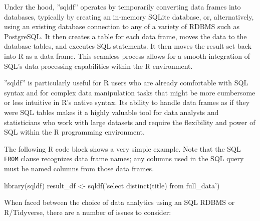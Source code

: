 Under the hood, ''sqldf'' operates by temporarily converting data frames into databases, typically by creating an in-memory SQLite database, or, alternatively, using an existing database connection to any of a variety of RDBMS such as PostgreSQL. It then creates a table for each data frame, moves the data to the database tables, and executes SQL statements. It then moves the result set back into R as a data frame. This seamless process allows for a smooth integration of SQL's data processing capabilities within the R environment.

''sqldf'' is particularly useful for R users who are already comfortable with SQL syntax and for complex data manipulation tasks that might be more cumbersome or less intuitive in R's native syntax. Its ability to handle data frames as if they were SQL tables makes it a highly valuable tool for data analysts and statisticians who work with large datasets and require the flexibility and power of SQL within the R programming environment.

The following R code block shows a very simple example. Note that the SQL \texttt{FROM} clause recognizes data frame names; any columns used in the SQL query must be named columns from those data frames.

\begin{Rcode}
library(sqldf)
result_df <- sqldf('select distinct(title) from full_data')
\end{Rcode}

When faced between the choice of data analytics using an SQL RDBMS or R/Tidyverse, there are a number of issues to consider:

